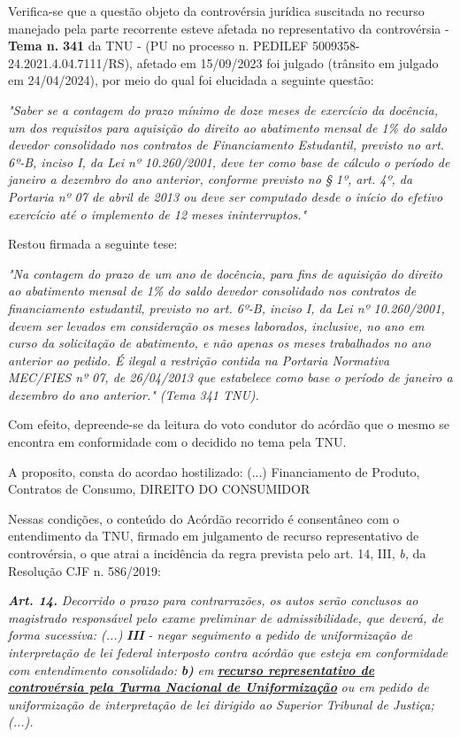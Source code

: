 \documentclass[12pt]{article}
\begin{document}
\justifying
\noindent Verifica-se que a questão objeto da controvérsia jurídica suscitada no recurso manejado pela parte recorrente esteve afetada no representativo da controvérsia - \textbf{Tema n. }\textbf{341} da TNU - (PU no processo n. PEDILEF 5009358-24.2021.4.04.7111/RS),  afetado em 15/09/2023 foi julgado (trânsito em julgado em 24/04/2024), por meio do qual foi elucidada a seguinte questão:

\noindent \textit{"Saber se a contagem do prazo mínimo de doze meses de exercício da docência, um dos requisitos para aquisição do direito ao abatimento mensal de 1\% do saldo devedor consolidado nos contratos de Financiamento Estudantil, previsto no art. 6º-B, inciso I, da Lei nº 10.260/2001, deve ter como base de cálculo o período de janeiro a dezembro do ano anterior, conforme previsto no § 1º, art. 4º, da Portaria nº 07 de abril de 2013 ou deve ser computado desde o início do efetivo exercício até o implemento de 12 meses ininterruptos."}

\noindent Restou firmada a seguinte tese:

\noindent \textit{"Na contagem do prazo de um ano de docência, para fins de aquisição do direito ao abatimento mensal de 1\% do saldo devedor consolidado nos contratos de financiamento estudantil, previsto no art. 6º-B, inciso I, da Lei nº 10.260/2001, devem ser levados em consideração os meses laborados, inclusive, no ano em curso da solicitação de abatimento, e não apenas os meses trabalhados no ano anterior ao pedido. É ilegal a restrição contida na Portaria Normativa MEC/FIES nº 07, de 26/04/2013 que estabelece como base o período de janeiro a dezembro do ano anterior." (Tema 341 TNU).}

\noindent Com efeito, depreende-se da leitura do voto condutor do acórdão que o mesmo se encontra em conformidade com o decidido no  tema pela TNU.

\noindent A proposito, consta do acordao hostilizado: (...) Financiamento de Produto, Contratos de Consumo, DIREITO DO CONSUMIDOR

\noindent Nessas condições, o conteúdo do Acórdão recorrido é consentâneo com o entendimento da TNU, firmado em julgamento de recurso representativo de controvérsia, o que atrai a incidência da regra prevista pelo art. 14, III, \textit{b,} da Resolução CJF n. 586/2019:

\noindent \textit{\textbf{Art. 14.}}\textit{ Decorrido o prazo para contrarrazões, os autos serão conclusos ao magistrado responsável pelo exame preliminar de admissibilidade, que deverá, de forma sucessiva: (...) }\textit{\textbf{III }}\textit{- negar seguimento a pedido de uniformização de interpretação de lei federal interposto contra acórdão que esteja em conformidade com entendimento consolidado: }\textit{\textbf{b)}}\textit{ em }\uline{\textit{\textbf{recurso representativo de controvérsia pela Turma Nacional de Uniformização}}}\textit{ ou em pedido de uniformização de interpretação de lei dirigido ao Superior Tribunal de Justiça;(...).}
\end{document}
